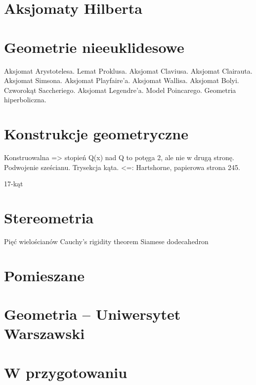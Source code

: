 \documentclass{greaseproof}
\begin{document}



\section{Aksjomaty Hilberta}

\section{Geometrie nieeuklidesowe}
Aksjomat Arystotelesa.
Lemat Proklusa.
Aksjomat Claviusa.
Aksjomat Clairauta.
Aksjomat Simsona.
Aksjomat Playfaire'a.
Aksjomat Wallisa.
Aksjomat Bolyi.
Czworokąt Saccheriego.
Aksjomat Legendre'a.
Model Poincarego.
Geometria hiperboliczna.

\section{Konstrukcje geometryczne}
Konstruowalna => stopień Q(x) nad Q to potęga 2, ale nie w drugą stronę.
Podwojenie sześcianu.
Trysekcja kąta.
<=: Hartshorne, papierowa strona 245.

17-kąt

\section{Stereometria}
Pięć wielościanów
Cauchy's rigidity theorem %
Siamese dodecahedron

\section{Pomieszane}









\section{Geometria -- Uniwersytet Warszawski}






\section{W przygotowaniu}


{}


\raggedright
{}
\printindex

\printindex[persons]
\end{document}
